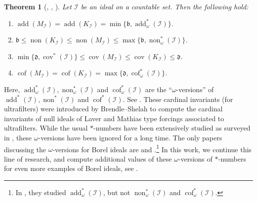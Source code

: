 \documentclass[a4paper,12pt]{amsart}
\newcounter{enuAlph}
\newtheorem{teorema}[enuAlph]{Theorem}
\theoremstyle{definition}
\numberwithin{thm}{section}
\numberwithin{equation}{section}
\newcommand{\bb}{\mathfrak{b}}
\newcommand{\dd}{\mathfrak{d}}
\DeclareMathOperator{\non}{non}
\DeclareMathOperator{\cov}{cov}
\DeclareMathOperator{\add}{add}
\DeclareMathOperator{\cof}{cof}
\newcommand{\I}{\mathscr{I}}
\begin{document}
    \begin{teorema}[, , ] \label{mainthm:basic_ineq}
        Let $\I$ be an ideal on a countable set. Then the following hold:
        \begin{enumerate}
            \item $\add(M_\I) = \add(K_\I) = \min\{\bb, \add^*_\omega(\I)\}$.
            \item\label{item:thmA_two} $\bb\leq\non(K_\I)\leq\non(M_\I)\leq\max\{\bb, \non^*_\omega(\I)\}$.
            \item $\min\{\dd, \cov^*(\I)\}\leq \cov(M_\I)\leq\cov(K_\I)\leq\dd$.
            \item $\cof(M_\I) = \cof(K_\I) = \max\{\dd, \cof^*_\omega(\I)\}$.
        \end{enumerate}
    \end{teorema}
    
    Here, $\add^*_\omega(\I), \non^*_\omega(\I)$ and $\cof^*_\omega(\I)$ are the ``$\omega$-versions'' of $\add^*(\I), \non^*(\I)$ and $\cof^*(\I)$. See . These cardinal invariants (for ultrafilters) were introduced by Brendle--Shelah \cite{BS99} to compute the cardinal invariants of null ideals of Laver and Mathias type forcings associated to ultrafilters. While the usual $*$-numbers have been extensively studied as surveyed in \cite{HH07}, these $\omega$-versions have been ignored for a long time. The only papers discussing the $\omega$-versions for Borel ideals are \cite{CM25} and \cite{FK25}.\footnote{In \cite{FK25}, they studied $\add^*_\omega(\I)$, but not $\non^*_\omega(\I)$ and $\cof^*_\omega(\I)$.} In this work, we continue this line of research, and compute additional values of these $\omega$-versions of $*$-numbers for even more examples of Borel ideals, see .
\end{document}
